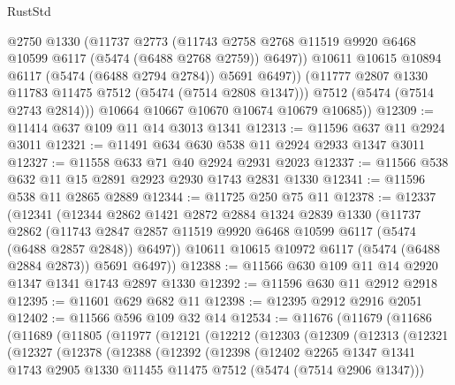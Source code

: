 \begin{lexlean}{RustStd}
\begin{coremodule}
              @2750
              @1330
              (@11737
                @2773
                (@11743
                  @2758
                  @2768
                  @11519
                  @9920
                  @6468
                  @10599
                  @6117
                  (@5474 (@6488 @2768 @2759))
                  @6497))
              @10611
              @10615
              @10894
              @6117
              (@5474 (@6488 @2794 @2784))
              @5691
              @6497))
          (@11777 @2807 @1330 @11783 @11475 @7512 (@5474 (@7514 @2808 @1347)))
          @7512
          (@5474 (@7514 @2743 @2814)))
        @10664
        @10667
        @10670
        @10674
        @10679
        @10685))
@12309 := @11414 @637 @109 @11 @14 @3013 @1341
@12313 := @11596 @637 @11 @2924 @3011
@12321 := @11491 @634 @630 @538 @11 @2924 @2933 @1347 @3011
@12327 := @11558 @633 @71 @40 @2924 @2931 @2023
@12337 := @11566 @538 @632 @11 @15 @2891 @2923 @2930 @1743 @2831 @1330
@12341 := @11596 @538 @11 @2865 @2889
@12344 := @11725 @250 @75 @11
@12378 := @12337
    (@12341
      (@12344
        @2862
        @1421
        @2872
        @2884
        @1324
        @2839
        @1330
        (@11737
          @2862
          (@11743 @2847 @2857 @11519 @9920 @6468 @10599 @6117 (@5474 (@6488 @2857 @2848)) @6497))
        @10611
        @10615
        @10972
        @6117
        (@5474 (@6488 @2884 @2873))
        @5691
        @6497))
@12388 := @11566 @630 @109 @11 @14 @2920 @1347 @1341 @1743 @2897 @1330
@12392 := @11596 @630 @11 @2912 @2918
@12395 := @11601 @629 @682 @11
@12398 := @12395 @2912 @2916 @2051
@12402 := @11566 @596 @109 @32 @14
@12534 := @11676
    (@11679
      (@11686
        (@11689
          (@11805
            (@11977
              (@12121
                (@12212
                  (@12303
                    (@12309
                      (@12313
                        (@12321
                          (@12327
                            (@12378
                              (@12388
                                (@12392
                                  (@12398
                                    (@12402
                                      @2265
                                      @1347
                                      @1341
                                      @1743
                                      @2905
                                      @1330
                                      @11455
                                      @11475
                                      @7512
                                      (@5474 (@7514 @2906 @1347)))

\end{coremodule}
\end{lexlean}
